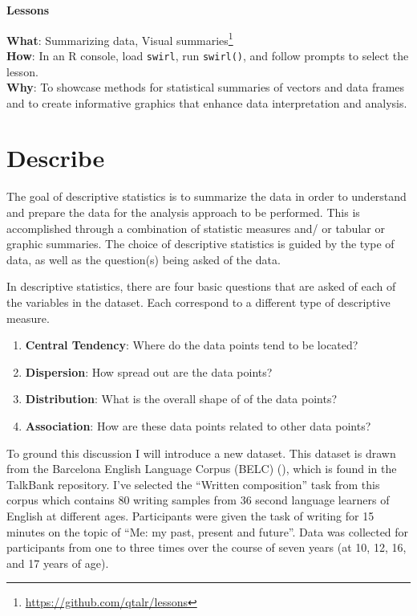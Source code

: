 \documentclass[
  letterpaper,
]{latex/krantz}
\providecommand{\tightlist}{%
  \setlength{\itemsep}{0pt}\setlength{\parskip}{0pt}}\usepackage{longtable,booktabs,array}
\theoremstyle{definition}
\theoremstyle{remark}
\DeclareRobustCommand{\href}[2]{#2\footnote{\url{#1}}}
\begin{document}
\begin{tcolorbox}[enhanced jigsaw, colback=white, colframe=quarto-callout-color-frame, leftrule=.75mm, opacityback=0, rightrule=.15mm, bottomrule=.15mm, toprule=.15mm, breakable, left=2mm, arc=.35mm]

\textbf{ Lessons}

\textbf{What}: \href{https://github.com/qtalr/lessons}{Summarizing data,
Visual summaries}\\
\textbf{How}: In an R console, load \texttt{swirl}, run
\texttt{swirl()}, and follow prompts to select the lesson.\\
\textbf{Why}: To showcase methods for statistical summaries of vectors
and data frames and to create informative graphics that enhance data
interpretation and analysis.

\end{tcolorbox}

\section{Describe}\label{sec-aa-describe}

The goal of descriptive statistics is to summarize the data in order to
understand and prepare the data for the analysis approach to be
performed. This is accomplished through a combination of statistic
measures and/ or tabular or graphic summaries. The choice of descriptive
statistics is guided by the type of data, as well as the question(s)
being asked of the data.

In descriptive statistics, there are four basic questions that are asked
of each of the variables in the dataset. Each correspond to a different
type of descriptive measure.

\begin{enumerate}
\def\labelenumi{\arabic{enumi}.}
\tightlist
\item
  \textbf{Central Tendency}: Where do the data points tend to be
  located?
\item
  \textbf{Dispersion}: How spread out are the data points?
\item
  \textbf{Distribution}: What is the overall shape of of the data
  points?
\item
  \textbf{Association}: How are these data points related to other data
  points?
\end{enumerate}

To ground this discussion I will introduce a new dataset. This dataset
is drawn from the Barcelona English Language Corpus (BELC)
(), which is found in the TalkBank
repository. I've selected the ``Written composition'' task from this
corpus which contains 80 writing samples from 36 second language
learners of English at different ages. Participants were given the task
of writing for 15 minutes on the topic of ``Me: my past, present and
future''. Data was collected for participants from one to three times
over the course of seven years (at 10, 12, 16, and 17 years of age).
\end{document}
